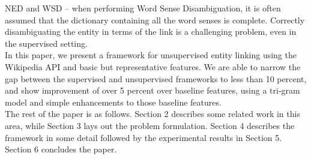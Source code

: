 NED and WSD -- when performing Word Sense Disambiguation, it is often assumed that the dictionary 
containing all the word senses is complete.
Correctly disambiguating the entity in terms of the link is a challenging problem, even in the supervised setting. \\
In this paper, we present a framework for unsupervised entity linking using the Wikipedia API and basic but representative features. We are able to narrow the gap between the supervised and unsupervised frameworks to less than 10 percent, and show improvement of over 5 percent over baseline features, using a tri-gram model and simple enhancements to those baseline features. \\
The rest of the paper is as follows. Section 2 describes some related work in this area, while Section 3 lays out the problem formulation. Section 4 describes the framework in some detail followed by the experimental results in Section 5. Section 6 concludes the paper.
